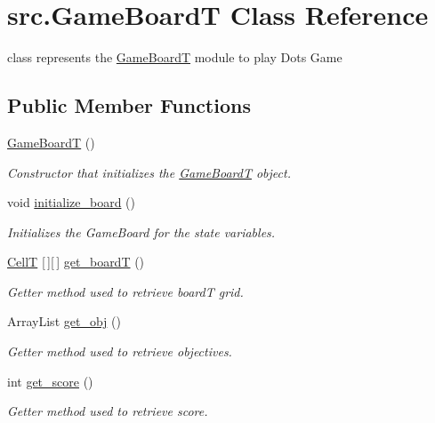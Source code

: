 \hypertarget{classsrc_1_1GameBoardT}{}\section{src.\+Game\+BoardT Class Reference}
\label{classsrc_1_1GameBoardT}


class represents the \hyperlink{classsrc_1_1GameBoardT}{Game\+BoardT} module to play Dots Game  


\subsection*{Public Member Functions}
\begin{DoxyCompactItemize}
\item 
\hyperlink{classsrc_1_1GameBoardT_a0bff613b5cb6df8ff1b47f24fc0854d0}{Game\+BoardT} ()
\begin{DoxyCompactList}\small\item\em Constructor that initializes the \hyperlink{classsrc_1_1GameBoardT}{Game\+BoardT} object. \end{DoxyCompactList}\item 
void \hyperlink{classsrc_1_1GameBoardT_a4e7f32af1e3a2e28f4579fe6c74ce7e4}{initialize\+\_\+board} ()
\begin{DoxyCompactList}\small\item\em Initializes the Game\+Board for the state variables. \end{DoxyCompactList}\item 
\hyperlink{enumsrc_1_1CellT}{CellT} \mbox{[}$\,$\mbox{]}\mbox{[}$\,$\mbox{]} \hyperlink{classsrc_1_1GameBoardT_ab6addd1e5e0c4575676034c9c59ff285}{get\+\_\+boardT} ()
\begin{DoxyCompactList}\small\item\em Getter method used to retrieve boardT grid. \end{DoxyCompactList}\item 
Array\+List \hyperlink{classsrc_1_1GameBoardT_ae878d201048e4cb169890f35e825e66c}{get\+\_\+obj} ()
\begin{DoxyCompactList}\small\item\em Getter method used to retrieve objectives. \end{DoxyCompactList}\item 
int \hyperlink{classsrc_1_1GameBoardT_a492ab6d3f4f02b3dac168ab54cb11917}{get\+\_\+score} ()
\begin{DoxyCompactList}\small\item\em Getter method used to retrieve score. \end{DoxyCompactList}\item 

\end{DoxyCompactItemize}
